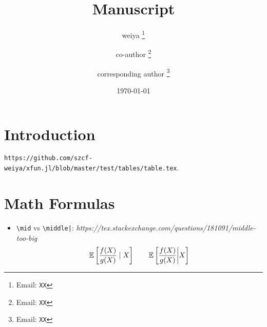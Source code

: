 \documentclass[12pt]{article}
\title{Manuscript}
\author[1]{weiya%
  \thanks{Email: \texttt{XX}}
}
\affil[1]{Department of Statistics, XX}
\author[1]{co-author%
  \thanks{Email: \texttt{XX}}
}
\author[2]{corresponding author%
\thanks{Email: \texttt{XX}}
}
\affil[2]{Department of Statistics, XX}
\date{\today}
\begin{document}
\maketitle
\pagestyle{fancy}
\lhead{}
\rhead{}

\maketitle

\section{Introduction}

\begin{table}[H]
    \centering
    \resizebox{1.0\textwidth}{!}{%
        
    }
    \caption{\texttt{https://github.com/szcf-weiya/xfun.jl/blob/master/test/tables/table.tex}.}
    \label{tab:test}
\end{table}

\section{Math Formulas}

\begin{itemize}
    \item \verb#\mid# vs \verb#\middle|#: \textit{https://tex.stackexchange.com/questions/181091/middle-too-big}
    $$
    {\mathbb E}\left[\frac{f(X)}{g(X)}\mid X\right] \qquad {\mathbb E}\left[\frac{f(X)}{g(X)}\middle| X\right]
    $$
\end{itemize}



\printbibliography
\end{document}
